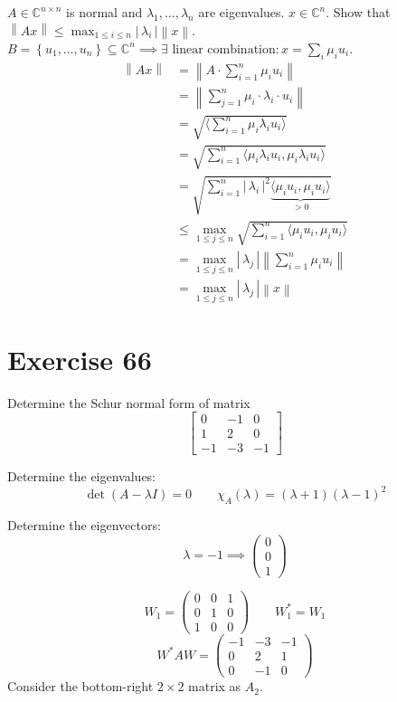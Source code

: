 \documentclass[a4paper]{article}
\theoremstyle{definition}
\newcommand\set[1]{\left\{#1\right\}}
\newcommand\card[1]{\left|\,#1\,\right|}
\newcommand\angel[1]{\langle#1\rangle}
\newcommand\norm[1]{\left\|{#1}\right\|}
\begin{document}
$A \in \mathbb C^{n \times n}$ is normal and $\lambda_1, \dots, \lambda_n$ are eigenvalues.
$x \in \mathbb C^n$. Show that $\norm{Ax} \leq \max_{1 \leq i \leq n} \card{\lambda_i} \norm{x}$.
$B = \set{u_1, \dots, u_n} \subseteq \mathbb C^n \implies \exists \text{ linear combination}: x = \sum_i \mu_i u_i$.
\begin{align*}
  \norm{Ax} &= \norm{A \cdot \sum_{i=1}^n \mu_i u_i} \\
    &= \norm{\sum_{j=1}^n \mu_i \cdot \lambda_i \cdot u_i} \\
    &= \sqrt{\angel{\sum_{i=1}^n \mu_i \lambda_i u_i}} \\
    &= \sqrt{\sum_{i=1}^n \angel{\mu_i \lambda_i u_i, \mu_i \lambda_i u_i}} \\
    &= \sqrt{\sum_{i=1}^n \card{\lambda_i}^2 \underbrace{\angel{\mu_i u_i, \mu_i u_i}}_{>0}} \\
    &\leq \max_{1 \leq j \leq n} \sqrt{\sum_{i=1}^n \angel{\mu_i u_i, \mu_i u_i}} \\
    &= \max_{1 \leq j \leq n} \card{\lambda_j} \norm{\sum_{i=1}^n \mu_i u_i} \\
    &= \max_{1 \leq j \leq n} \card{\lambda_j} \norm{x}
\end{align*}

\section*{Exercise 66}
\begin{ex}
  Determine the Schur normal form of matrix
  \[ \begin{bmatrix} 0 & -1 & 0 \\ 1 & 2 & 0 \\ -1 & -3 & -1 \end{bmatrix} \]
\end{ex}

Determine the eigenvalues:
\[ \det(A - \lambda I) = 0 \qquad \chi_A(\lambda) = (\lambda + 1)(\lambda - 1)^2 \]

Determine the eigenvectors:
\[ \lambda = -1 \implies \begin{pmatrix} 0 \\ 0 \\ 1 \end{pmatrix} \]

\[ W_1 = \begin{pmatrix} 0 & 0 & 1 \\ 0 & 1 & 0 \\ 1 & 0 & 0 \end{pmatrix} \qquad W_1^* = W_1 \]
\[ W^* A W = \begin{pmatrix} -1 & -3 & -1 \\ 0 & 2 & 1 \\ 0 & -1 & 0 \end{pmatrix} \]
Consider the bottom-right $2\times 2$ matrix as $A_2$.
\end{document}
